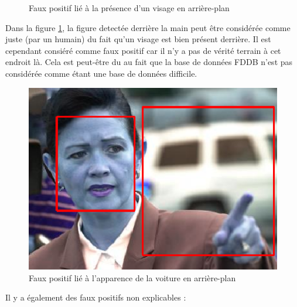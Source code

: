 \documentclass[a4paper,11pt]{article}
\begin{document}
\begin{figure}[H]
\begin{minipage}[c]{0.45\linewidth}
\begin{center}
	                \caption{Faux positif lié à la présence d'un visage en arrière-plan}
			\label{fig:fp}
	            \end{center}
	        \end{minipage}
	    \end{figure}

	    Dans la figure \ref{fig:fp}, la figure detectée derrière la main peut être considérée comme
	    juste (par un humain) du fait qu'un visage est bien présent derrière. Il est cependant consiéré comme
	    faux positif car il n'y a pas de vérité terrain à cet endroit là. Cela est peut-être du
	    au fait que la base de données FDDB n'est pas considérée comme étant une base de données
	    difficile.
	    
	    \begin{figure}[H]
	        \begin{center}
	            \includegraphics[scale=0.45]{facenetFP5.png}
	            \caption{Faux positif lié à l'apparence de la voiture en arrière-plan}
	        \end{center}
	    \end{figure}
	    
	    Il y a également des faux positifs non explicables :\\
	    
\end{document}
